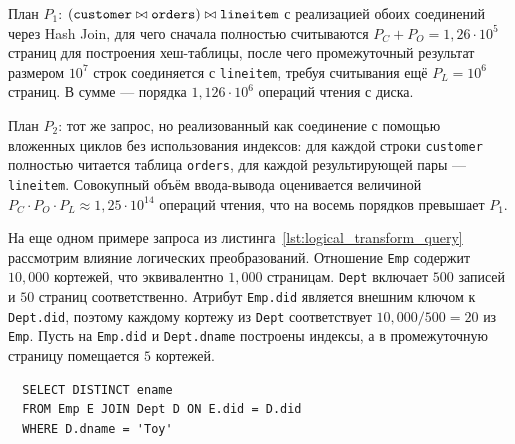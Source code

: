 \documentclass[14pt, russian]{scrartcl}
\begin{document}
План \(P_1\):
\((\texttt{customer} \bowtie \texttt{orders}) \bowtie \texttt{lineitem}\)
с реализацией обоих соединений через Hash Join, для чего сначала
полностью считываются \(P_C + P_O = 1{,}26 \cdot 10^5\) страниц для
построения хеш-таблицы, после чего промежуточный результат размером
\(10^7\) строк соединяется с \texttt{lineitem}, требуя считывания ещё %
\(P_L = 10^6\) страниц. В сумме --- порядка \(1{,}126 \cdot 10^6\)
операций чтения с диска.

План \(P_2\): тот же запрос, но реализованный как соединение с помощью
вложенных циклов без использования индексов: для каждой строки
\texttt{customer} полностью читается таблица \texttt{orders}, для каждой
результирующей пары --- \texttt{lineitem}. Совокупный объём ввода-вывода
оценивается величиной
\(P_C \cdot P_O \cdot P_L \approx 1{,}25 \cdot 10^{14}\) операций
чтения, что на восемь порядков превышает \(P_1\).

На еще одном примере запроса из листинга~\ref{lst:logical_transform_query}
рассмотрим влияние логических преобразований. Отношение \texttt{Emp} содержит
\(10{,}000\) кортежей, что эквивалентно \(1{,}000\) страницам. \texttt{Dept}
включает \(500\) записей и \(50\) страниц соответственно. Атрибут
\texttt{Emp.did} является внешним ключом к \texttt{Dept.did}, поэтому каждому
кортежу из \texttt{Dept} соответствует \(10{,}000 / 500 = 20\) из \texttt{Emp}.
Пусть на \texttt{Emp.did} и \texttt{Dept.dname} построены индексы, а в
промежуточную страницу помещается \(5\) кортежей.

\begin{listing}
  \caption{Пример запроса с проекцией, фильтрацией и соединением.}
  \label{lst:logical_transform_query}
  \begin{verbatim}
  SELECT DISTINCT ename
  FROM Emp E JOIN Dept D ON E.did = D.did
  WHERE D.dname = 'Toy'
  \end{verbatim}
\end{listing}
\end{document}
